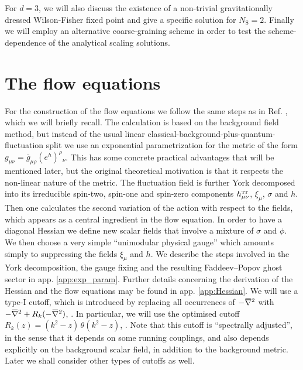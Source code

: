 \documentclass[11pt]{book}
\newcommand{\overbar}[1]{\mkern 1.5mu\overline{\mkern-1.5mu#1\mkern-1.5mu}\mkern 1.5mu}
\newcommand\TTspace{ -1pt }
\newcommand\hTTmunu{ h^{\scriptscriptstyle{\mathrm{T\hspace{\TTspace}T}}}_{\mu\nu} }
\newcommand\NS{ N_{\scriptscriptstyle{\mathrm{S}}} }
\newcommand{\bnabla}{\overbar \nabla}
\numberwithin{equation}{chapter}
\begin{document}
For $d=3$, we will also discuss the existence
of a non-trivial gravitationally dressed Wilson-Fisher fixed point
and give a specific solution for $\NS=2$.
Finally we will employ an alternative coarse-graining scheme
in order to test the scheme-dependence of the analytical scaling solutions.


\section{The flow equations}

For the construction of the flow equations we follow the same steps
as in Ref. \cite{Percacci:2015wwa}, which we will briefly recall.
The calculation is based on the background field method,
but instead of the usual linear classical-background-plus-quantum-fluctuation split we
use an exponential parametrization for the metric of the form
$g_{\mu\nu} = \bar g_{\mu\rho}(e^h)^\rho{}_\nu$.
This has some concrete practical advantages that will be mentioned later,
but the original theoretical motivation is that it
respects the non-linear nature of the metric.
The fluctuation field is further York decomposed into its irreducible
spin-two, spin-one and spin-zero components $\hTTmunu$,
$\xi_\mu$, $\sigma$ and $h$.
Then one calculates the second variation of the action with
respect to the fields, which appears as a central ingredient
in the flow equation.
In order to have a diagonal Hessian we define new scalar fields
that involve a mixture of $\sigma$ and $\phi$.
We then choose a very simple ``unimodular physical gauge''
which amounts simply to suppressing the fields $\xi_\mu$ and $h$.
We describe the steps involved in the York decomposition, the
gauge fixing and the resulting Faddeev–Popov ghost sector in app. \ref{app:exp_param}.
Further details concerning the derivation of the Hessian and the flow
equations may be found in app. \ref{app:Hessian}.
We will use a type-I cutoff, which is introduced by replacing
all occurrences of $-\bnabla^2$ with $-\bnabla^2+R_k(-\bnabla^2)$,
\cite{Codello:2008vh}.
In particular, we will use the optimised cutoff
$R_k(z)=\left( k^2-z \right) \, \theta \! \left( k^2-z \right)$, \cite{Litim:2001up}.
Note that this cutoff is ``spectrally adjusted'',
in the sense that it depends on some running couplings,
and also depends explicitly on the background scalar field,
in addition to the background metric.
Later we shall consider other types of cutoffs as well.
\end{document}
